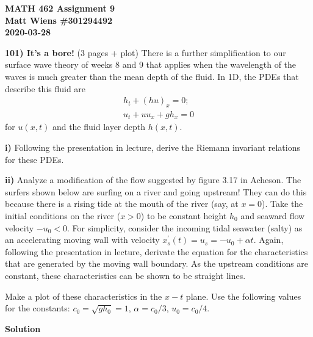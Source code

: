 \documentclass{article}
\begin{document}
\textbf{MATH 462 Assignment 9} \\
\textbf{Matt Wiens \#301294492} \\
\textbf{2020-03-28}

\textbf{101) It's a bore!} (3 pages + plot)
There is a further simplification to our surface wave theory of weeks 8
and 9 that applies when the wavelength of the waves is much greater than
the mean depth of the fluid. In 1D, the PDEs that describe this fluid
are
%
\begin{align*}
    h_t + (h u)_x = 0; \\
    u_t + u u_x + g h_x = 0
\end{align*}
%
for $u(x, t)$ and the fluid layer depth $h(x, t)$.

\textbf{i)} Following the presentation in lecture, derive the Riemann
invariant relations for these PDEs.

\textbf{ii)} Analyze a modification of the flow suggested by figure 3.17
in Acheson. The surfers shown below are surfing on a river and going
upstream! They can do this because there is a rising tide at the mouth
of the river (say, at $x = 0$). Take the initial conditions on the river
($x > 0$) to be constant height $h_0$ and seaward flow velocity $-u_0 <
0$. For simplicity, consider the incoming tidal seawater (salty) as an
accelerating moving wall with velocity $x^\prime_s(t) = u_s = -u_0 +
\alpha t$. Again, following the presentation in lecture, derivate the
equation for the characteristics that are generated by the moving wall
boundary. As the upstream conditions are constant, these characteristics
can be shown to be straight lines.

Make a plot of these characteristics in the $x-t$ plane. Use the
following values for the constants: $c_0 = \sqrt{g h_0} = 1$, $\alpha =
c_0 / 3$, $u_0 = c_0 / 4$.

\newpage

\textbf{Solution}
\end{document}
